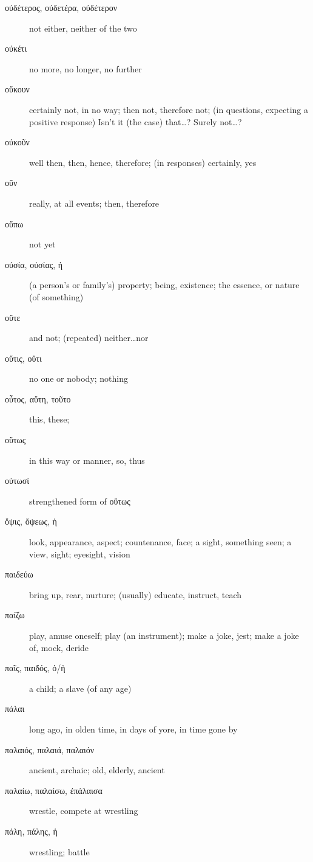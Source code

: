 \documentclass[12pt,letterpaper]{article}
\begin{document}
\begin{description}
    \item[\textgreek{οὐδέτερος, οὐδετέρα, οὐδέτερον}] not either, neither of the two
    \item[\textgreek{οὐκέτι}] \marginnote{*}no more, no longer, no further
    \item[\textgreek{οὔκουν}] certainly not, in no way; then not, therefore not; (in questions, expecting a positive response) Isn't it (the case) that\dots ? Surely not\dots ?
    \item[\textgreek{οὐκοῦν}] \marginnote{*}well then, then, hence, therefore; (in responses) certainly, yes
    \item[\textgreek{οῦν}] \marginnote{*}really, at all events; then, therefore
    \item[\textgreek{οὔπω}] not yet
    \item[\textgreek{οὐσία, οὐσίας, ἡ}] \marginnote{*}(a person's or family's) property; being, existence; the essence, or nature (of something)
    \item[\textgreek{οὔτε}] \marginnote{*}and not; (repeated) neither\dots nor
    \item[\textgreek{οὔτις, οὔτι}] no one or nobody; nothing
    \item[\textgreek{οὗτος, αὕτη, τοῦτο}] \marginnote{*}this, these; 
    \item[\textgreek{οὕτως}] \marginnote{*}in this way or manner, so, thus
    \item[\textgreek{οὑτωσί}] \marginnote{*}strengthened form of \textgreek{οὕτως}
    \item[\textgreek{ὄψις, ὄψεως, ἡ}] look, appearance, aspect; countenance, face; a sight, something seen; a view, sight; eyesight, vision
    \item[\textgreek{παιδεύω}] bring up, rear, nurture; (usually) educate, instruct, teach
    \item[\textgreek{παίζω}] play, amuse oneself; play (an instrument); make a joke, jest; make a joke of, mock, deride
    \item[\textgreek{παῖς, παιδός, ὁ/ἡ}] \marginnote{*}a child; a slave (of any age)
    \item[\textgreek{πάλαι}] long ago, in olden time, in days of yore, in time gone by
    \item[\textgreek{παλαιός, παλαιά, παλαιόν}] \marginnote{*}ancient, archaic; old, elderly, ancient
    \item[\textgreek{παλαίω, παλαίσω, ἐπάλαισα}] wrestle, compete at wrestling
    \item[\textgreek{πάλη, πάλης, ἡ}] wrestling; battle

\end{description}
\end{document}
